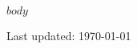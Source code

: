 \documentclass[11pt, a4paper]{article}
\begin{document}
  \begin{raggedright}
    $body$
  \end{raggedright}

  \vfill{}

  \begin{center}
    {\scriptsize  Last updated: \today}
  \end{center}
\end{document}

